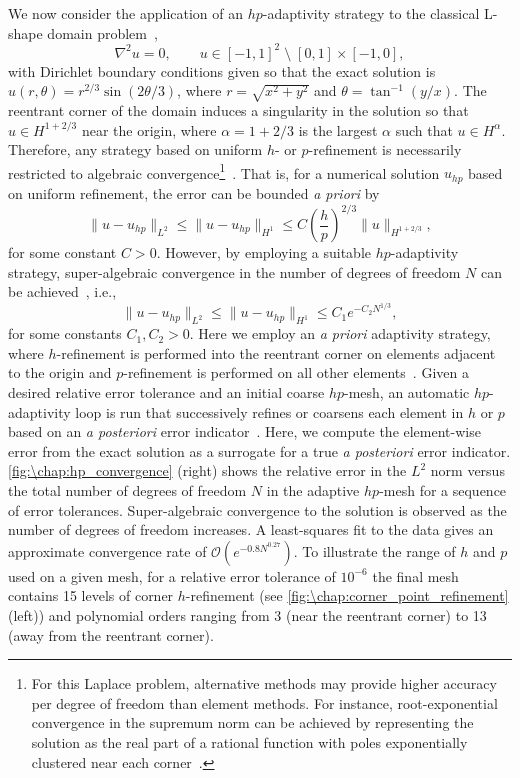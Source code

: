We now consider the application of an $hp$-adaptivity strategy to the classical L-shape domain problem~\cite{Mitchell_13_01},
\begin{equation}\label{eq:\chap:Lshape}
\nabla^2 u = 0, \qquad u \in [-1,1]^2 \;\setminus\; [0,1] \times [-1,0],
\end{equation}
with Dirichlet boundary conditions given so that the exact solution is $u(r,\theta) = r^{2/3} \sin(2\theta/3)$, where $r = \sqrt{x^2 + y^2}$ and $\theta = \tan^{-1}(y/x)$. The reentrant corner of the domain induces a singularity in the solution so that $u \in H^{1+2/3}$ near the origin, where $\alpha = 1+2/3$ is the largest $\alpha$ such that $u \in H^{\alpha}$. Therefore, any strategy based on uniform $h$- or $p$-refinement is necessarily restricted to algebraic convergence\footnote{For this Laplace problem, alternative methods may provide higher accuracy per degree of freedom than element methods. For instance, root-exponential convergence in the supremum norm can be achieved by representing the solution as the real part of a rational function with poles exponentially clustered near each corner~\cite{Gopal_19_01}.}~\cite{Babuska_87_01}. That is, for a numerical solution $u_{hp}$ based on uniform refinement, the error can be bounded \emph{a priori} by
\[
\|u - u_{hp}\|_{L^2} \leq \|u - u_{hp}\|_{H^1} \leq C \left(\frac{h}{p}\right)^{2/3} \|u\|_{H^{1+2/3}},
\]
for some constant $C>0$. However, by employing a suitable $hp$-adaptivity strategy, super-algebraic convergence in the number of degrees of freedom $N$ can be achieved~\cite{Babuska_86_01}, i.e.,
\[
\|u - u_{hp}\|_{L^2} \leq \|u - u_{hp}\|_{H^1} \leq C_1 e^{-C_2 N^{1/3}},
\]
for some constants $C_1, C_2 > 0$. Here we employ an \emph{a priori} adaptivity strategy, where $h$-refinement is performed into the reentrant corner on elements adjacent to the origin and $p$-refinement is performed on all other elements~\cite{Ainsworth_98_01}. Given a desired relative error tolerance and an initial coarse $hp$-mesh, an automatic $hp$-adaptivity loop is run that successively refines or coarsens each element in $h$ or $p$ based on an \emph{a posteriori} error indicator~\cite{Mitchell_11_01, Ainsworth_97_01}. Here, we compute the element-wise error from the exact solution as a surrogate for a true \emph{a posteriori} error indicator. \cref{fig:\chap:hp_convergence} (right) shows the relative error in the $L^2$ norm versus the total number of degrees of freedom $N$ in the adaptive $hp$-mesh for a sequence of error tolerances. Super-algebraic convergence to the solution is observed as the number of degrees of freedom increases. A least-squares fit to the data gives an approximate convergence rate of $\mathcal{O}(e^{-0.8 N^{0.27}})$. To illustrate the range of $h$ and $p$ used on a given mesh, for a relative error tolerance of $10^{-6}$ the final mesh contains 15 levels of corner $h$-refinement (see \cref{fig:\chap:corner_point_refinement} (left)) and polynomial orders ranging from 3 (near the reentrant corner) to 13 (away from the reentrant corner).

